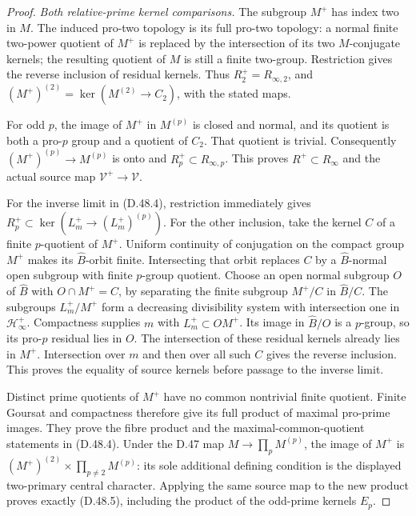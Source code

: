 \begin{proof}
\emph{Both relative-prime kernel comparisons.}
The subgroup \(M^+\) has index two in \(M\). The induced
pro-two topology is its full pro-two topology: a normal
finite two-power quotient of \(M^+\) is replaced by the
intersection of its two \(M\)-conjugate kernels; the
resulting quotient of \(M\) is still a finite two-group.
Restriction gives the reverse inclusion of residual kernels.
Thus \(R_2^+=R_{\infty,2}\), and
\((M^+)^{(2)}=\ker(M^{(2)}\to C_2)\), with the stated maps.

For odd \(p\), the image of \(M^+\) in \(M^{(p)}\)
is closed and normal, and its quotient is both a pro-\(p\)
group and a quotient of \(C_2\). That quotient is trivial.
Consequently \((M^+)^{(p)}\to M^{(p)}\) is onto and
\(R_p^+\subset R_{\infty,p}\). This proves
\(R^+\subset R_\infty\) and the actual source map
\(\mathcal V^+\to\mathcal V\).

For the inverse limit in (D.48.4), restriction immediately
gives
\(R_p^+\subset\ker(L_m^+\to(L_m^+)^{(p)})\).
For the other inclusion, take the kernel \(C\) of a finite
\(p\)-quotient of \(M^+\). Uniform continuity of conjugation
on the compact group \(M^+\) makes its \(\widehat B\)-orbit
finite. Intersecting that orbit replaces \(C\) by a
\(\widehat B\)-normal open subgroup with finite \(p\)-group
quotient. Choose an open normal subgroup \(O\) of
\(\widehat B\) with \(O\cap M^+=C\), by separating the
finite subgroup \(M^+/C\) in \(\widehat B/C\).
The subgroups \(L_m^+/M^+\) form a decreasing divisibility
system with intersection one in \(\mathcal H^+_\infty\).
Compactness supplies \(m\) with \(L_m^+\subset OM^+\).
Its image in \(\widehat B/O\) is a \(p\)-group, so its
pro-\(p\) residual lies in \(O\). The intersection of
these residual kernels already lies in \(M^+\).
Intersection over \(m\)
and then over all such \(C\) gives the reverse inclusion.
This proves the equality of source kernels before passage
to the inverse limit.

Distinct prime quotients of \(M^+\) have no common
nontrivial finite quotient. Finite Goursat and compactness
therefore give its full product of maximal pro-prime images.
They prove the fibre product and the maximal-common-quotient
statements in (D.48.4). Under the D.47 map
\(M\to\prod_p M^{(p)}\), the image of \(M^+\) is
\((M^+)^{(2)}\times\prod_{p\ne2}M^{(p)}\): its sole
additional defining condition is the displayed two-primary
central character. Applying the same source map to the
new product proves exactly (D.48.5), including the product
of the odd-prime kernels \(E_p\).


\end{proof}
